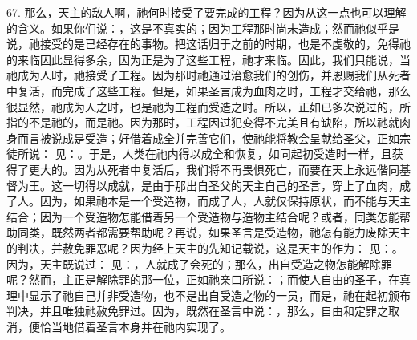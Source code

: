 67. 那么，天主的敌人啊，祂何时接受了要完成的工程？因为从这一点也可以理解的含义。如果你们说：，这是不真实的；因为工程那时尚未造成；然而祂似乎是说，祂接受的是已经存在的事物。把这话归于之前的时期，也是不虔敬的，免得祂的来临因此显得多余，因为正是为了这些工程，祂才来临。因此，我们只能说，当祂成为人时，祂接受了工程。因为那时祂通过治愈我们的创伤，并恩赐我们从死者中复活，而完成了这些工程。但是，如果圣言成为血肉之时，工程才交给祂，那么很显然，祂成为人之时，也是祂为工程而受造之时。所以，正如已多次说过的，所指的不是祂的，而是祂。因为那时，工程因过犯变得不完美且有缺陷，所以祂就肉身而言被说成是受造；好借着成全并完善它们，使祂能将教会呈献给圣父，正如宗徒所说： 见：。于是，人类在祂内得以成全和恢复，如同起初受造时一样，且获得了更大的。因为从死者中复活后，我们将不再畏惧死亡，而要在天上永远偕同基督为王。这一切得以成就，是由于那出自圣父的天主自己的圣言，穿上了血肉，成了人。因为，如果祂本是一个受造物，而成了人，人就仅保持原状，而不能与天主结合；因为一个受造物怎能借着另一个受造物与造物主结合呢？或者，同类怎能帮助同类，既然两者都需要帮助呢？再说，如果圣言是受造物，祂怎有能力废除天主的判决，并赦免罪恶呢？因为经上天主的先知记载说，这是天主的作为： 见：。因为，天主既说过： 见：，人就成了会死的；那么，出自受造之物怎能解除罪呢？然而，主正是解除罪的那一位，正如祂亲口所说：；而使人自由的圣子，在真理中显示了祂自己并非受造物，也不是出自受造之物的一员，而是，祂在起初颁布判决，并且唯独祂赦免罪过。因为，既然在圣言中说：，那么，自由和定罪之取消，便恰当地借着圣言本身并在祂内实现了。\par

